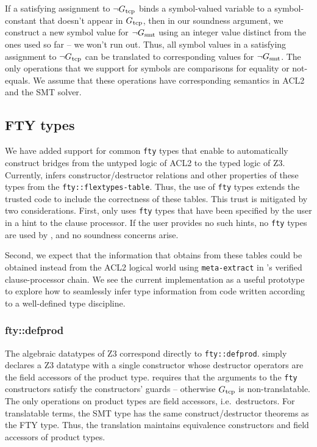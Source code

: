 If a satisfying assignment to $\neg G_{\mathrm{tcp}}$ binds a symbol-valued variable
to a symbol-constant that doesn't appear in $G_{\mathrm{tcp}}$, then in our soundness
argument, we construct a new symbol value for $\neg G_{\mathrm{smt}}$ using an integer
value distinct from the ones used so far -- we won't run out.
Thus, all symbol values in a satisfying assignment to $\neg G_{\mathrm{tcp}}$
can be translated to corresponding values for $\neg G_{\mathrm{smt}}$.
The only operations that we support for symbols are comparisons for equality or
not-equals.  We assume that these operations have corresponding semantics in
ACL2 and the SMT solver.


\subsection{FTY types}
We have added support for common \texttt{fty} types that enable \smtlink{} to
automatically construct bridges from the untyped logic of ACL2 to the typed logic of Z3.
Currently, \smtlink{} infers constructor/destructor relations and other properties
of these types from the \texttt{fty::flextypes-table}.
Thus, the use of \texttt{fty} types extends
the trusted code to include the correctness of these tables.  This trust is mitigated
by two considerations.  First, \smtlink{} only uses \texttt{fty} types that have been
specified by the user in a hint to the \smtlink{} clause processor.  If the user
provides no such hints, no \texttt{fty} types are used by \smtlink{}, and no
soundness concerns arise.

Second, we expect that the information that \smtlink{} obtains from these tables could
be obtained instead from the ACL2 logical world using \texttt{meta-extract} in
\smtlink{}'s verified clause-processor chain.  We see the current implementation
as a useful prototype to explore how to seamlessly infer type information from
code written according to a well-defined type discipline.

\subsubsection{fty::defprod}
The algebraic datatypes of Z3 correspond directly to \texttt{fty::defprod}.
\smtlink{} simply declares a Z3 datatype with a single constructor whose
destructor operators are the field accessors of the product type.
\smtlink{} requires that the arguments to the \texttt{fty} constructors satisfy
the constructors' guards -- otherwise $G_{\mathrm{tcp}}$ is non-translatable.
The only operations on product types are field accessors, i.e.\ destructors.
For translatable terms, the SMT type has the same construct/destructor theorems
as the FTY type.  Thus, the \smtlink{} translation maintains equivalence
constructors and field accessors of product types.

